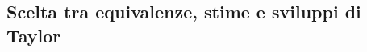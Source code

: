 \subsection{Scelta tra equivalenze, stime e sviluppi di Taylor}
\label{sec:esercizi-taylor-e-asintotici-scelta-del-metodo-di-applicazione}
